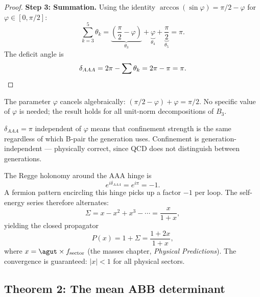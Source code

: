\begin{proof}
\medskip\noindent\textbf{Step 3: Summation.}
Using the identity $\arccos(\sin\varphi) = \pi/2 - \varphi$ for
$\varphi \in [0, \pi/2]$:
\begin{equation}
\sum_{k=3}^{5} \theta_k
= \underbrace{\left(\frac{\pi}{2} - \varphi\right)}_{\theta_3}
+ \underbrace{\varphi}_{\theta_4}
+ \underbrace{\frac{\pi}{2}}_{\theta_5}
= \pi.
\end{equation}
The deficit angle is
\begin{equation}
\delta_{AAA} = 2\pi - \sum\theta_k = 2\pi - \pi = \pi. \qedhere
\end{equation}
\end{proof}

\begin{remark}[Universality]
The parameter $\varphi$ cancels algebraically: $(\pi/2 - \varphi) + \varphi = \pi/2$.  No specific value of $\varphi$ is needed; the result holds for all unit-norm decompositions of $B_3$.
\end{remark}

\begin{remark}
$\delta_{AAA} = \pi$ independent of $\varphi$ means that confinement strength is the same regardless of which B-pair the generation uses.  Confinement is generation-independent --- physically correct, since QCD does not distinguish between generations.
\end{remark}

\begin{corollary}
\label{cor:alternating}
The Regge holonomy around the AAA hinge is
\begin{equation}
e^{i\delta_{AAA}} = e^{i\pi} = -1.
\end{equation}
A fermion pattern encircling this hinge picks up a factor $-1$ per
loop.  The self-energy series therefore alternates:
\begin{equation}
\Sigma = x - x^2 + x^3 - \cdots = \frac{x}{1+x},
\end{equation}
yielding the closed propagator
\begin{equation}
P(x) = 1 + \Sigma = \frac{1 + 2x}{1 + x},
\end{equation}
where $x = \agut \times f_{\text{sector}}$ (the masses chapter, \textit{Physical Predictions}).
The convergence is guaranteed: $|x| < 1$ for all physical sectors.
\end{corollary}

\subsection{Theorem 2: The mean ABB determinant}
\label{sec:thm_ABB}

